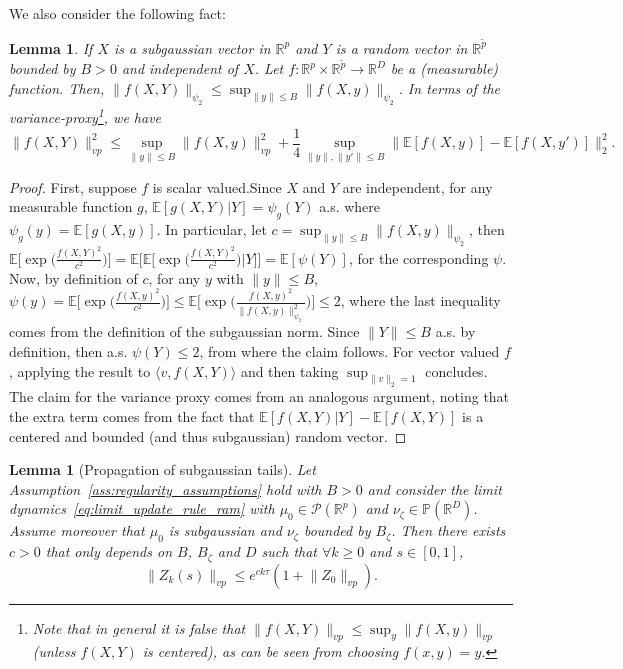 \documentclass[a4paper,11pt]{article}
\newcommand{\R}{\mathbb{R}}
\newcommand{\1}{\mathbbm{1}}
\newcommand{\E}{\mathbb{E}}
\renewcommand{\P}{\mathbb{P}}
\newtheorem{lemma}[theorem]{Lemma}
\theoremstyle{definition}
\theoremstyle{remark}
\begin{document}
{We also consider the following fact: 
\begin{lemma}\label{lem:subgaussian_and_bounded_independent}
    If $X$ is a subgaussian vector in $\R^p$ and $Y$ is a random vector in $\R^{\tilde{p}}$ bounded by $B>0$ and independent of $X$. Let $f:\R^p\times\R^{\tilde{p}}\to \R^D$ be a (measurable) function. Then,
    \(\|f(X, Y)\|_{\psi_2} \leq \sup_{\|y\|\leq B}\|f(X,y)\|_{\psi_2}\). In terms of the variance-proxy\footnote{{Note that in general it is false that $\|f(X,Y)\|_{vp} \leq \sup_y \|f(X,y)\|_{vp}$ (unless $f(X,Y)$ is centered), as can be seen from choosing $f(x,y) = y$.}}, we have \[\|f(X, Y)\|_{vp}^2 \leq \sup_{\|y\|\leq B}\|f(X,y)\|_{vp}^2 + \frac{1}{4}\sup_{\|y\|, \|y'\|\leq B}\|\E[f(X,y)]-\E[f(X,y')]\|_{2}^2.\]
\end{lemma}
\begin{proof}
    {First, suppose $f$ is scalar valued.}Since $X$ and $Y$ are independent, for any measurable function $g$, $\E[g(X,Y)|Y] = \psi_g(Y)$ a.s. where $\psi_g(y) = \E[g(X,y)]$. In particular, let $c = \sup_{\|y\|\leq B}\|f(X,y)\|_{\psi_2}$, then
    \(\E\Big[\exp\Big(\frac{f(X, Y)^2}{c^2}\Big)\Big] = \E\Big[\E\Big[\exp\Big(\frac{f(X, Y)^2}{c^2}\Big)\Big|Y\Big]\Big] = \E[\psi(Y)]\), for the corresponding $\psi$. Now, by definition of $c$, for any $y$ with $\|y\|\leq B$, $\psi(y) = \E\Big[\exp\Big(\frac{f(X, y)^2}{c^2}\Big)\Big] \leq \E\Big[\exp\Big(\frac{f(X, y)^2}{\|f(X, y)\|_{\psi_2}^2}\Big)\Big] \leq 2$, where the last inequality comes from the definition of the subgaussian norm.
    Since $\|Y\| \leq B$ a.s. by definition, then a.s. $\psi(Y) \leq 2$, from where the claim follows. {For vector valued $f$, applying the result to $\langle v, f(X,Y)\rangle$ and then taking $\sup_{\|v\|_2 =1}$ concludes.}
    The claim for the variance proxy comes from an analogous argument, noting that the extra term comes from the fact that $\E[f(X, Y)|Y] - \E[f(X, Y)]$ is a centered and bounded (and thus subgaussian) random vector.
\end{proof}
}

\begin{lemma}[Propagation of subgaussian tails]\label{lem:propagation_of_subgaussianity}
Let Assumption~\ref{ass:regularity_assumptions} hold with $B > 0$ and consider the limit dynamics~\eqref{eq:limit_update_rule_ram} with $\mu_0 \in \mathcal{P}(\R^p)$ and $\nu_\zeta \in \P(\R^D)$. Assume moreover that $\mu_0$ is subgaussian {and $\nu_\zeta$ bounded by $B_\zeta$}. Then there exists $c > 0$ that only depends on $B$, $B_\zeta$ and $D$ such that $\forall k \geq 0$ and $s \in [0,1]$,
\[
    \|Z_k(s)\|_{vp} \le e^{ck\tau}({1+} \|Z_0\|_{vp}).
\]
\end{lemma}
\end{document}
